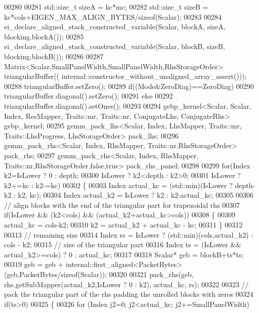 \begin{DoxyCode}
00280 
00281     std::size\_t sizeA = kc*mc;
00282     std::size\_t sizeB = kc*cols+EIGEN\_MAX\_ALIGN\_BYTES/\textcolor{keyword}{sizeof}(Scalar);
00283 
00284     ei\_declare\_aligned\_stack\_constructed\_variable(Scalar, blockA, sizeA, blocking.blockA());
00285     ei\_declare\_aligned\_stack\_constructed\_variable(Scalar, blockB, sizeB, blocking.blockB());
00286 
00287     Matrix<Scalar,SmallPanelWidth,SmallPanelWidth,RhsStorageOrder> triangularBuffer((
      internal::constructor\_without\_unaligned\_array\_assert()));
00288     triangularBuffer.setZero();
00289     \textcolor{keywordflow}{if}((Mode&ZeroDiag)==ZeroDiag)
00290       triangularBuffer.diagonal().setZero();
00291     \textcolor{keywordflow}{else}
00292       triangularBuffer.diagonal().setOnes();
00293 
00294     gebp\_kernel<Scalar, Scalar, Index, ResMapper, Traits::mr, Traits::nr, ConjugateLhs, ConjugateRhs> 
      gebp\_kernel;
00295     gemm\_pack\_lhs<Scalar, Index, LhsMapper, Traits::mr, Traits::LhsProgress, LhsStorageOrder> pack\_lhs;
00296     gemm\_pack\_rhs<Scalar, Index, RhsMapper, Traits::nr,RhsStorageOrder> pack\_rhs;
00297     gemm\_pack\_rhs<Scalar, Index, RhsMapper, Traits::nr,RhsStorageOrder,false,true> pack\_rhs\_panel;
00298 
00299     \textcolor{keywordflow}{for}(Index k2=IsLower ? 0 : depth;
00300         IsLower ? k2<depth  : k2>0;
00301         IsLower ? k2+=kc   : k2-=kc)
00302     \{
00303       Index actual\_kc = (std::min)(IsLower ? depth-k2 : k2, kc);
00304       Index actual\_k2 = IsLower ? k2 : k2-actual\_kc;
00305 
00306       \textcolor{comment}{// align blocks with the end of the triangular part for trapezoidal rhs}
00307       \textcolor{keywordflow}{if}(IsLower && (k2<cols) && (actual\_k2+actual\_kc>cols))
00308       \{
00309         actual\_kc = cols-k2;
00310         k2 = actual\_k2 + actual\_kc - kc;
00311       \}
00312 
00313       \textcolor{comment}{// remaining size}
00314       Index rs = IsLower ? (std::min)(cols,actual\_k2) : cols - k2;
00315       \textcolor{comment}{// size of the triangular part}
00316       Index ts = (IsLower && actual\_k2>=cols) ? 0 : actual\_kc;
00317 
00318       Scalar* geb = blockB+ts*ts;
00319       geb = geb + internal::first\_aligned<PacketBytes>(geb,PacketBytes/\textcolor{keyword}{sizeof}(Scalar));
00320 
00321       pack\_rhs(geb, rhs.getSubMapper(actual\_k2,IsLower ? 0 : k2), actual\_kc, rs);
00322 
00323       \textcolor{comment}{// pack the triangular part of the rhs padding the unrolled blocks with zeros}
00324       \textcolor{keywordflow}{if}(ts>0)
00325       \{
00326         \textcolor{keywordflow}{for} (Index j2=0; j2<actual\_kc; j2+=SmallPanelWidth)

\end{DoxyCode}
